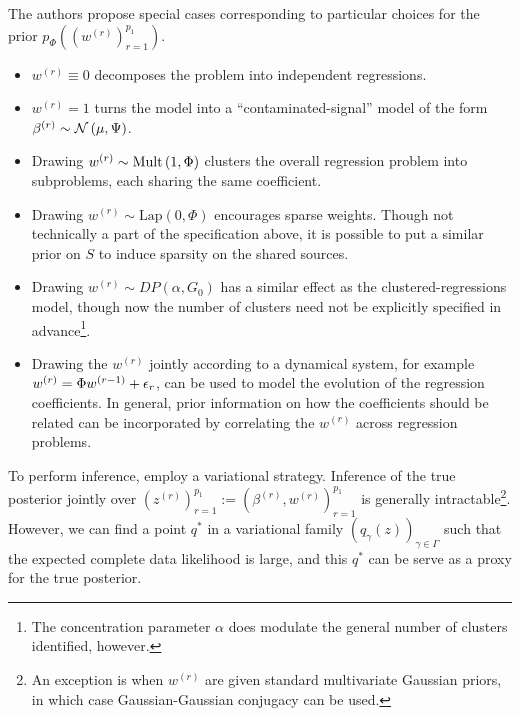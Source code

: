 \documentclass[14pt]{extarticle}
\begin{document}
The authors propose special cases corresponding to particular choices for the
prior $p_{\Phi}\left(\left(w^{(r)}\right)_{r = 1}^{p_{1}}\right)$.
\begin{itemize}
  \item $w^{(r)} \equiv 0$ decomposes the problem into independent regressions.
  \item $w^{(r)} = 1$ turns the model into a ``contaminated-signal'' model of
    the form $\beta^{(r)} \sim \mathcal{N}\left(\mu, \Psi\right)$.
  \item Drawing $w^{(r)} \sim \textnormal{Mult}\left(1, \Phi\right)$ clusters the overall
    regression problem into subproblems, each sharing the same coefficient.
  \item Drawing $w^{(r)} \sim \text{Lap}\left(0, \Phi\right)$ encourages sparse
    weights. Though not technically a part of the specification above, it is
    possible to put a similar prior on $S$ to induce sparsity on the shared
    sources.
  \item Drawing $w^{(r)} \sim DP\left(\alpha, G_{0}\right)$ has a similar effect
    as the clustered-regressions model, though now the number of clusters need
    not be explicitly specified in advance\footnote{The concentration parameter
      $\alpha$ does modulate the general number of clusters identified,
      however.}.
  \item Drawing the $w^{(r)}$ jointly according to a dynamical system, for
    example $w^{(r)} = \Phi w^{(r - 1)} + \epsilon_{r}$, can be used to model the
    evolution of the regression coefficients. In general, prior information on
    how the coefficients should be related can be incorporated by correlating
    the $w^{(r)}$ across regression problems.
\end{itemize}
To perform inference, \cite{zhang2005learning} employ a variational strategy.
Inference of the true posterior jointly over $\left(z^{(r)}\right)_{r =
  1}^{p_{1}} := \left(\beta^{(r)}, w^{(r)}\right)_{r = 1}^{p_{1}}$ is generally
intractable\footnote{An exception is when $w^{(r)}$ are given standard
  multivariate Gaussian priors, in which case Gaussian-Gaussian conjugacy can be
  used.}. However, we can find a point $q^{\ast}$ in a variational family
$\left(q_{\gamma}\left(z\right)\right)_{\gamma \in \Gamma}$ such that the
expected complete data likelihood is large, and this $q^{\ast}$ can be serve as
a proxy for the true posterior.
\end{document}
